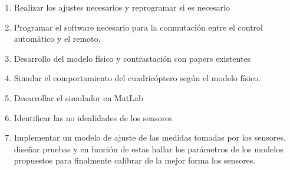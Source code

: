 \documentclass[spanish,12pt,a4paper,titlepage]{report}
\begin{document}
\begin{enumerate}
	\item Realizar los ajustes necesarios y reprogramar si es necesario
	\item Programar el software necesario para la conmutación entre el control automático y el remoto.
	\item Desarrollo del modelo físico y contrastación con papers existentes
	\item Simular el comportamiento del cuadricóptero según el modelo físico.
	\item Desarrollar el simulador en MatLab
	\item Identificar las no idealidades de los sensores
	\item Implementar un modelo de ajuste de las medidas tomadas por los sensores, diseñar pruebas y en función de estas hallar los parámetros de los modelos propuestos para finalmente calibrar de la mejor forma los sensores.
\end{enumerate}
\end{document}

